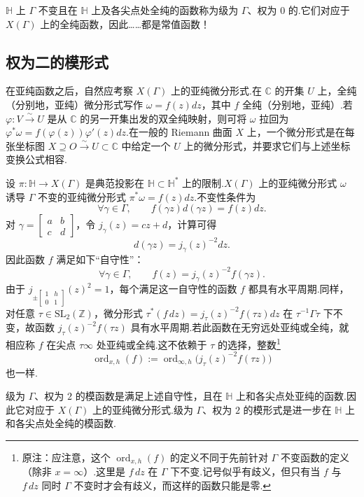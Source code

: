 $\mathbb H$ 上 $\Gamma$ 不变且在 $\mathbb H$ 上及各尖点处全纯的函数称为级为 $\Gamma$、权为 $0$ 的.它们对应于 $X(\Gamma)$ 上的全纯函数，因此……都是常值函数！
\subsection{权为二的模形式}\label{sec:modular-1-2-2}
在亚纯函数之后，自然应考察 $X(\Gamma)$ 上的亚纯微分形式.在 $\mathbb C$ 的开集 $U$ 上，全纯（分别地，亚纯）微分形式写作 $\omega=f(z)dz$，其中 $f$ 全纯（分别地，亚纯）.若 $\varphi:V\xrightarrow{\sim}U$ 是从 $\mathbb C$ 的另一开集出发的双全纯映射，则可将 $\omega$ 拉回为 $\varphi^*\omega=f(\varphi(z))\varphi'(z)dz$.在一般的 Riemann 曲面 $X$ 上，一个微分形式是在每张坐标图 $X\supseteq O\xrightarrow{\sim}U\subset\mathbb C$ 中给定一个 $U$ 上的微分形式，并要求它们与上述坐标变换公式相容.

设 $\pi:\mathbb H\longrightarrow X(\Gamma)$ 是典范投影在 $\mathbb H\subset\mathbb H^*$ 上的限制.$X(\Gamma)$ 上的亚纯微分形式 $\omega$ 诱导 $\Gamma$ 不变的亚纯微分形式 $\pi^*\omega=f(z)dz$.不变性条件为
\[
\forall\gamma\in\Gamma,\qquad f(\gamma z)d(\gamma z)=f(z)dz.
\]
对 $\gamma=\left[\begin{smallmatrix}a&b\\c&d\end{smallmatrix}\right]$，令 $j_\gamma(z)=cz+d$，计算可得
\[
d(\gamma z)=j_\gamma(z)^{-2}dz.
\]
因此函数 $f$ 满足如下``自守性''：
\[
\forall\gamma\in\Gamma,\qquad f(z)=j_\gamma(z)^{-2}f(\gamma z).
\]
由于 $j_{\pm\left[\begin{smallmatrix}1&h\\0&1\end{smallmatrix}\right]}(z)^2=1$，每个满足这一自守性的函数 $f$ 都具有水平周期.同样，对任意 $\tau\in\mathrm{SL}_2(\mathbb Z)$，微分形式 $\tau^*(f\,dz)=j_\tau(z)^{-2}f(\tau z)dz$ 在 $\tau^{-1}\Gamma\tau$ 下不变，故函数 $j_\tau(z)^{-2}f(\tau z)$ 具有水平周期.若此函数在无穷远处亚纯或全纯，就相应称 $f$ 在尖点 $\tau\infty$ 处亚纯或全纯.这不依赖于 $\tau$ 的选择，整数\footnote{原注：应注意，这个 $\operatorname{ord}_{x,h}(f)$ 的定义不同于先前针对 $\Gamma$ 不变函数的定义（除非 $x=\infty$）.这里是 $f\,dz$ 在 $\Gamma$ 下不变.记号似乎有歧义，但只有当 $f$ 与 $f\,dz$ 同时 $\Gamma$ 不变时才会有歧义，而这样的函数只能是零.}
\[
\operatorname{ord}_{x,h}(f):=\operatorname{ord}_{\infty,h}\bigl(j_\tau(z)^{-2}f(\tau z)\bigr)
\]
也一样.

级为 $\Gamma$、权为 $2$ 的模函数是满足上述自守性，且在 $\mathbb H$ 上和各尖点处亚纯的函数.因此它对应于 $X(\Gamma)$ 上的亚纯微分形式.级为 $\Gamma$、权为 $2$ 的模形式是进一步在 $\mathbb H$ 上和各尖点处全纯的模函数.

